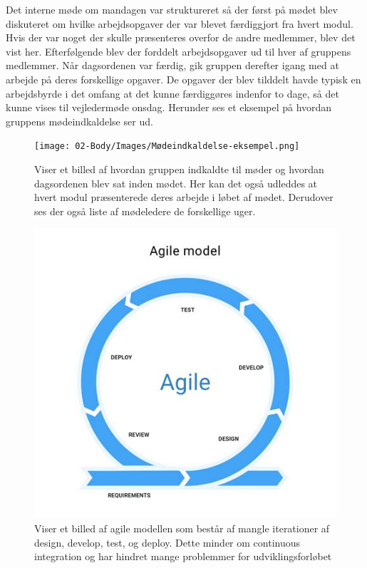 Det interne møde om mandagen var struktureret så der først på mødet blev diskuteret om hvilke arbejdsopgaver der var blevet færdiggjort fra hvert modul. Hvis der var noget der skulle præsenteres overfor de andre medlemmer, blev det vist her. Efterfølgende blev der forddelt arbejdsopgaver ud til hver af gruppens medlemmer. Når dagsordenen var færdig, gik gruppen derefter igang med at arbejde på deres forskellige opgaver. De opgaver der blev tilddelt havde typisk en arbejdsbyrde i det omfang at det kunne færdiggøres indenfor to dage, så det kunne vises til vejledermøde onsdag. Herunder ses et eksempel på hvordan gruppens mødeindkaldelse ser ud.

\begin{figure}[H]
  \centering
  \texttt{[image: 02-Body/Images/Mødeindkaldelse-eksempel.png]}
  \caption{Viser et billed af hvordan gruppen indkaldte til møder og hvordan dagsordenen blev sat inden mødet. Her kan det også udleddes at hvert modul præsenterede deres arbejde i løbet af mødet. Derudover ses der også liste af mødeledere de forskellige uger.}
  \label{fig:Agile}
\end{figure}

\begin{figure}[H]
  \centering
  \includegraphics[scale=.5]{02-Body/Images/Agile.png}
  \caption{Viser et billed af agile modellen som består af mangle iterationer
           af design, develop, test, og deploy. Dette minder om continuous integration
           og har hindret mange problemmer for udviklingsforløbet}
  \label{fig:Agile}
\end{figure}

